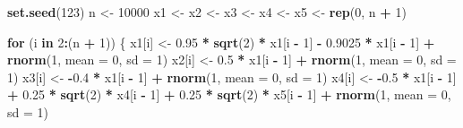 \documentclass[]{book}
\newenvironment{Shaded}{\begin{snugshade}}{\end{snugshade}}
\newcommand{\KeywordTok}[1]{\textcolor[rgb]{0.13,0.29,0.53}{\textbf{#1}}}
\newcommand{\DataTypeTok}[1]{\textcolor[rgb]{0.13,0.29,0.53}{#1}}
\newcommand{\DecValTok}[1]{\textcolor[rgb]{0.00,0.00,0.81}{#1}}
\newcommand{\FloatTok}[1]{\textcolor[rgb]{0.00,0.00,0.81}{#1}}
\newcommand{\StringTok}[1]{\textcolor[rgb]{0.31,0.60,0.02}{#1}}
\newcommand{\ControlFlowTok}[1]{\textcolor[rgb]{0.13,0.29,0.53}{\textbf{#1}}}
\newcommand{\OperatorTok}[1]{\textcolor[rgb]{0.81,0.36,0.00}{\textbf{#1}}}
\newcommand{\NormalTok}[1]{#1}
\theoremstyle{definition}
\theoremstyle{definition}
\theoremstyle{definition}
\theoremstyle{remark}
\begin{document}
\begin{Shaded}
\begin{Highlighting}[]
\KeywordTok{set.seed}\NormalTok{(}\DecValTok{123}\NormalTok{)}
\NormalTok{n <-}\StringTok{ }\DecValTok{10000}
\NormalTok{x1 <-}\StringTok{ }\NormalTok{x2 <-}\StringTok{ }\NormalTok{x3 <-}\StringTok{ }\NormalTok{x4 <-}\StringTok{ }\NormalTok{x5 <-}\StringTok{ }\KeywordTok{rep}\NormalTok{(}\DecValTok{0}\NormalTok{, n }\OperatorTok{+}\StringTok{ }\DecValTok{1}\NormalTok{)}

\ControlFlowTok{for}\NormalTok{ (i }\ControlFlowTok{in} \DecValTok{2}\OperatorTok{:}\NormalTok{(n }\OperatorTok{+}\StringTok{ }\DecValTok{1}\NormalTok{)) \{}
\NormalTok{  x1[i] <-}\StringTok{ }\FloatTok{0.95} \OperatorTok{*}\StringTok{ }\KeywordTok{sqrt}\NormalTok{(}\DecValTok{2}\NormalTok{) }\OperatorTok{*}\StringTok{ }\NormalTok{x1[i }\OperatorTok{-}\StringTok{ }\DecValTok{1}\NormalTok{] }\OperatorTok{-}\StringTok{ }\FloatTok{0.9025} \OperatorTok{*}\StringTok{ }\NormalTok{x1[i }\OperatorTok{-}\StringTok{ }
\StringTok{    }\DecValTok{1}\NormalTok{] }\OperatorTok{+}\StringTok{ }\KeywordTok{rnorm}\NormalTok{(}\DecValTok{1}\NormalTok{, }\DataTypeTok{mean =} \DecValTok{0}\NormalTok{, }\DataTypeTok{sd =} \DecValTok{1}\NormalTok{)}
\NormalTok{  x2[i] <-}\StringTok{ }\FloatTok{0.5} \OperatorTok{*}\StringTok{ }\NormalTok{x1[i }\OperatorTok{-}\StringTok{ }\DecValTok{1}\NormalTok{] }\OperatorTok{+}\StringTok{ }\KeywordTok{rnorm}\NormalTok{(}\DecValTok{1}\NormalTok{, }\DataTypeTok{mean =} \DecValTok{0}\NormalTok{, }\DataTypeTok{sd =} \DecValTok{1}\NormalTok{)}
\NormalTok{  x3[i] <-}\StringTok{ }\OperatorTok{-}\FloatTok{0.4} \OperatorTok{*}\StringTok{ }\NormalTok{x1[i }\OperatorTok{-}\StringTok{ }\DecValTok{1}\NormalTok{] }\OperatorTok{+}\StringTok{ }\KeywordTok{rnorm}\NormalTok{(}\DecValTok{1}\NormalTok{, }\DataTypeTok{mean =} \DecValTok{0}\NormalTok{, }\DataTypeTok{sd =} \DecValTok{1}\NormalTok{)}
\NormalTok{  x4[i] <-}\StringTok{ }\OperatorTok{-}\FloatTok{0.5} \OperatorTok{*}\StringTok{ }\NormalTok{x1[i }\OperatorTok{-}\StringTok{ }\DecValTok{1}\NormalTok{] }\OperatorTok{+}\StringTok{ }\FloatTok{0.25} \OperatorTok{*}\StringTok{ }\KeywordTok{sqrt}\NormalTok{(}\DecValTok{2}\NormalTok{) }\OperatorTok{*}\StringTok{ }\NormalTok{x4[i }\OperatorTok{-}\StringTok{ }\DecValTok{1}\NormalTok{] }\OperatorTok{+}\StringTok{ }
\StringTok{    }\FloatTok{0.25} \OperatorTok{*}\StringTok{ }\KeywordTok{sqrt}\NormalTok{(}\DecValTok{2}\NormalTok{) }\OperatorTok{*}\StringTok{ }\NormalTok{x5[i }\OperatorTok{-}\StringTok{ }\DecValTok{1}\NormalTok{] }\OperatorTok{+}\StringTok{ }\KeywordTok{rnorm}\NormalTok{(}\DecValTok{1}\NormalTok{, }\DataTypeTok{mean =} \DecValTok{0}\NormalTok{, }\DataTypeTok{sd =} \DecValTok{1}\NormalTok{)}

\end{Highlighting}
\end{Shaded}
\end{document}
